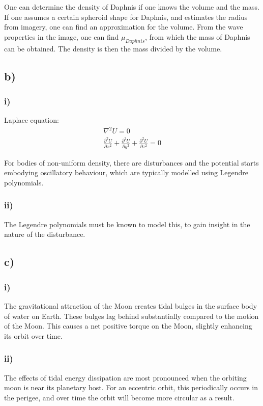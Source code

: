 One can determine the density of Daphnis if one knows the volume and the mass. If one assumes a certain spheroid shape for Daphnis, and estimates the radius from imagery, one can find an approximation for the volume. From the wave properties in the image, one can find $\mu_{Daphnis}$, from which the mass of Daphnis can be obtained. The density is then the mass divided by the volume.

\subsection*{b)}
\subsubsection*{i)}
Laplace equation:
\begin{equation}
\begin{split}
        \nabla^2 U = 0 \\
        \frac{\partial^2 U}{\partial x^2} + \frac{\partial^2 U}{\partial y^2} + \frac{\partial^2 U}{\partial z^2} = 0
\end{split}
\end{equation}

For bodies of non-uniform density, there are disturbances and the potential starts embodying oscillatory behaviour, which are typically modelled using Legendre polynomials. 

\subsubsection*{ii)}
The Legendre polynomials must be known to model this, to gain insight in the nature of the disturbance.

\subsection*{c)}
\subsubsection*{i)}
The gravitational attraction of the Moon creates tidal bulges in the surface body of water on Earth. These bulges lag behind substantially compared to the motion of the Moon. This causes a net positive torque on the Moon, slightly enhancing its orbit over time.

\subsubsection*{ii)}
The effects of tidal energy dissipation are most pronounced when the orbiting moon is near its planetary host. For an eccentric orbit, this periodically occurs in the perigee, and over time the orbit will become more circular as a result.

